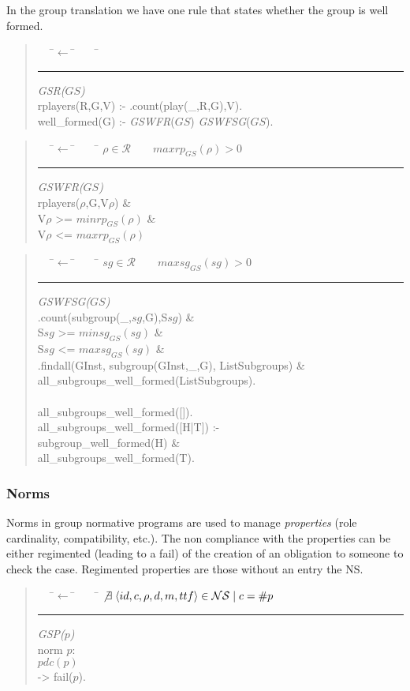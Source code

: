 \documentclass{article}
\newcommand{\st}{\mid}
\newcommand{\set}[1]{\mathcal{#1}}
\newcommand{\andalso}{\quad\quad}
\newenvironment{rwrule}[2]
{\begin{quote}\ttfamily\begin{tabbing}~~~\=$\leftarrow$ \= ~~~ \= \kill
     \ensuremath{#2}\\
     \rule[2pt]{6.5cm}{.3pt} \hfill \rwlabel{#1}\\}
{\end{tabbing}\end{quote}}
\newcommand{\rwlabel}[1]{{\scshape\itshape\textrm{#1}}}
\theoremstyle{definition} \newtheorem{definition}{Definition}
\begin{document}
In the group translation we have one rule that states whether the
group is well formed.

\begin{rwrule}{GSR($GS$)}
  {}
  rplayers(R,G,V) :- .count(play(\_,R,G),V).\\
  well\_formed(G)  :- \rwlabel{GSWFR}($GS$) \rwlabel{GSWFSG}($GS$).
\end{rwrule}

\begin{rwrule}{GSWFR($GS$)}
  {\rho \in \set{R} \andalso maxrp_{GS}(\rho) > 0}
  rplayers($\rho$,G,V$\rho$) \& \\
  V$\rho$ >= $minrp_{GS}(\rho)$ \& \\
  V$\rho$ <= $maxrp_{GS}(\rho)$
\end{rwrule}

\begin{rwrule}{GSWFSG($GS$)}
  {sg \in \set{R} \andalso maxsg_{GS}(sg) > 0}
  .count(subgroup(\_,$sg$,G),S$sg$) \& \\
  S$sg$ >= $minsg_{GS}(sg)$ \& \\
  S$sg$ <= $maxsg_{GS}(sg)$ \& \\
  .findall(GInst, subgroup(GInst,\_,G), ListSubgroups) \& \\
   all\_subgroups\_well\_formed(ListSubgroups).\\
~\\
all\_subgroups\_well\_formed([]).\\
all\_subgroups\_well\_formed([H|T]) :- \\
\> subgroup\_well\_formed(H) \& \\
\> all\_subgroups\_well\_formed(T).
\end{rwrule}

\subsubsection{Norms}

Norms in group normative programs are used to manage \emph{properties}
(role cardinality, compatibility, etc.). The non compliance with the
properties can be either regimented (leading to a fail) of the
creation of an obligation to someone to check the case.  Regimented
properties are those without an entry the NS.

\begin{rwrule}{GSP($p$)}
  {\not \exists \; \langle id, c, \rho, d, m, ttf \rangle \in \set{NS} \st  c = \#p}
  norm $p$: \\
  \> \>         $pdc(p)$\\
  \>   -> \> fail($p$). 
\end{rwrule}
\end{document}
